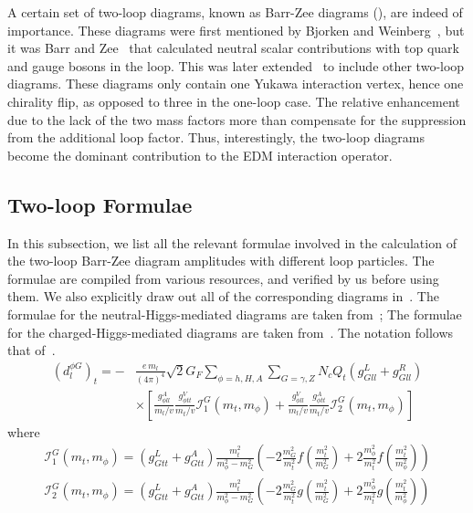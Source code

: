 A certain set of two-loop diagrams, known as Barr-Zee diagrams (), are indeed of importance.
These diagrams were first mentioned by Bjorken and Weinberg~\cite{BjorkenWeinberg1977TwoLoop},
but it was Barr and Zee~\cite{BarrZee1990TwoLoop} that calculated neutral scalar contributions with top quark and gauge bosons in the loop.
This was later extended~\cite{Leigh1991EDM,Chang1991EDM,Kao1992EDM,BowserChao1997EDM,Abe2016EDM} to include other two-loop diagrams.
These diagrams only contain one Yukawa interaction vertex, hence one chirality flip, as opposed to three in the one-loop case.
The relative enhancement due to the lack of the two mass factors more than compensate for the suppression from the additional loop factor.
Thus, interestingly, the two-loop diagrams become the dominant contribution to the EDM interaction operator.

\subsection{Two-loop Formulae}
In this subsection, we list all the relevant formulae involved in the calculation of the two-loop Barr-Zee diagram amplitudes with different loop particles.
The formulae are compiled from various resources, and verified by us before using them.
We also explicitly draw out all of the corresponding diagrams in~.
The formulae for the neutral-Higgs-mediated diagrams are taken from~\cite{Abe2016EDM};
The formulae for the charged-Higgs-mediated diagrams are taken from~\cite{BowserChao1997EDM,Abe2016EDM}.
The notation follows that of~\cite{Abe2016EDM}.
\begin{align}\label{eq:BarrZee-phiG-toploop}
	(d^{\phi G}_{l})_{t} = -&\frac{e\,m_{l}}{(4\pi)^{4}}\sqrt{2}G_{F}\sum_{\phi=h,H,A}\sum_{G=\gamma,Z}N_{c}Q_{t}(g_{Gll}^{L}+g_{Gll}^{R}) \nonumber \\
	& \times \left[\frac{g_{\phi ll}^{A}}{m_{l}/v}\frac{g_{\phi tt}^{V}}{m_{t}/v}\mathcal{I}_{1}^{G}(m_{t}, m_{\phi}) + \frac{g_{\phi ll}^{V}}{m_{l}/v}\frac{g_{\phi tt}^{A}}{m_{t}/v}\mathcal{I}_{2}^{G}(m_{t}, m_{\phi})\right]
\end{align}
where
\begin{align}
	\mathcal{I}_{1}^{G}(m_{t},m_{\phi}) = (g_{Gtt}^{L}+g_{Gtt}^{A})\frac{m_{t}^{2}}{m_{\phi}^{2}-m_{G}^{2}}
	\left(-2\frac{m_{G}^{2}}{m_{t}^{2}} f\left(\frac{m_{t}^{2}}{m_{G}^{2}}\right) + 2\frac{m_{\phi}^{2}}{m_{t}^{2}} f\left(\frac{m_{t}^{2}}{m_{\phi}^{2}}\right)\right) \nonumber \\
	\mathcal{I}_{2}^{G}(m_{t},m_{\phi}) = (g_{Gtt}^{L}+g_{Gtt}^{A})\frac{m_{t}^{2}}{m_{\phi}^{2}-m_{G}^{2}}
	\left(-2\frac{m_{G}^{2}}{m_{t}^{2}} g\left(\frac{m_{t}^{2}}{m_{G}^{2}}\right) + 2\frac{m_{\phi}^{2}}{m_{t}^{2}} g\left(\frac{m_{t}^{2}}{m_{\phi}^{2}}\right)\right)
\end{align}

